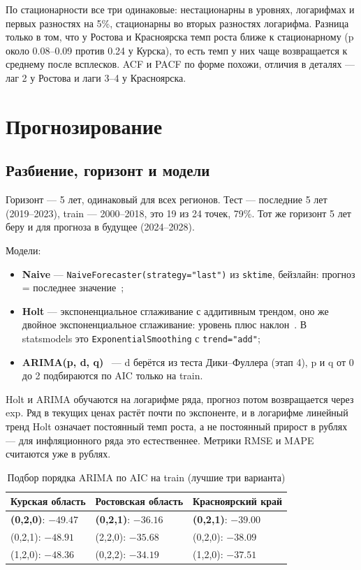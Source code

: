 \documentclass[12pt,a4paper]{report}
\begin{document}
По стационарности все три одинаковые: нестационарны в уровнях, логарифмах и первых разностях на 5\%, стационарны во вторых разностях логарифма. Разница только в том, что у Ростова и Красноярска темп роста ближе к стационарному (p около 0.08--0.09 против 0.24 у Курска), то есть темп у них чаще возвращается к среднему после всплесков. ACF и PACF по форме похожи, отличия в деталях --- лаг 2 у Ростова и лаги 3--4 у Красноярска.

\chapter{Прогнозирование}

\section{Разбиение, горизонт и модели}

Горизонт --- 5 лет, одинаковый для всех регионов. Тест --- последние 5 лет (2019--2023), train --- 2000--2018, это 19 из 24 точек, 79\%. Тот же горизонт 5 лет беру и для прогноза в будущее (2024--2028).

Модели:
\begin{itemize}
    \item \textbf{Naive} --- \texttt{NaiveForecaster(strategy="last")} из \texttt{sktime}, бейзлайн: прогноз = последнее значение~\cite{sf-m3};
    \item \textbf{Holt} --- экспоненциальное сглаживание с аддитивным трендом, оно же двойное экспоненциальное сглаживание: уровень плюс наклон~\cite{sf-m4,habr-ods}. В statsmodels это \texttt{ExponentialSmoothing} с \texttt{trend="add"};
    \item \textbf{ARIMA(p, d, q)}~\cite{sf-m5} --- d берётся из теста Дики--Фуллера (этап 4), p и q от 0 до 2 подбираются по AIC только на train.
\end{itemize}

Holt и ARIMA обучаются на логарифме ряда, прогноз потом возвращается через exp. Ряд в текущих ценах растёт почти по экспоненте, и в логарифме линейный тренд Holt означает постоянный темп роста, а не постоянный прирост в рублях --- для инфляционного ряда это естественнее. Метрики RMSE и MAPE считаются уже в рублях.

\begin{table}[H]
\centering
\caption{Подбор порядка ARIMA по AIC на train (лучшие три варианта)}
\label{tab:aic}
\begin{tabular}{lll}
\toprule
Курская область & Ростовская область & Красноярский край \\
\midrule
\textbf{(0,2,0)}: $-49.47$ & \textbf{(0,2,1)}: $-36.16$ & \textbf{(0,2,1)}: $-39.00$ \\
(0,2,1): $-48.91$ & (2,2,0): $-35.68$ & (0,2,0): $-38.09$ \\
(1,2,0): $-48.36$ & (0,2,2): $-34.19$ & (1,2,0): $-37.51$ \\
\bottomrule
\end{tabular}
\end{table}
\end{document}

